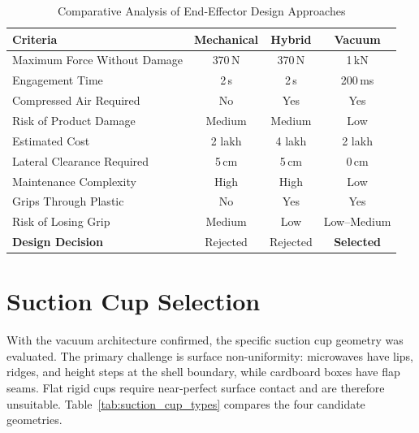 \begin{table}[htbp]
    \centering
    \caption{Comparative Analysis of End-Effector Design Approaches}
    \label{tab:ee_comparison}
    \begin{tabular}{l c c c}
        \toprule
        \textbf{Criteria} & \textbf{Mechanical} & \textbf{Hybrid} 
                          & \textbf{Vacuum} \\
                          \midrule
        Maximum Force Without Damage & 370\,N & 370\,N & 1\,kN \\
        Engagement Time & 2\,s & 2\,s & 200\,ms \\
        Compressed Air Required & No & Yes & Yes \\
        Risk of Product Damage & Medium & Medium & Low \\
        Estimated Cost & 2 lakh & 4 lakh & 2 lakh \\
        Lateral Clearance Required & 5\,cm & 5\,cm & 0\,cm \\
        Maintenance Complexity & High & High & Low \\
        Grips Through Plastic & No & Yes & Yes \\
        Risk of Losing Grip & Medium & Low & Low--Medium \\
        \textbf{Design Decision} & Rejected & Rejected & \textbf{Selected} \\
        \bottomrule
    \end{tabular}
\end{table}

\section{Suction Cup Selection}

With the vacuum architecture confirmed, the specific suction cup geometry 
was evaluated. The primary challenge is surface non-uniformity: microwaves 
have lips, ridges, and height steps at the shell boundary, while cardboard 
boxes have flap seams. Flat rigid cups require near-perfect surface contact 
and are therefore unsuitable. Table~\ref{tab:suction_cup_types} compares 
the four candidate geometries.

